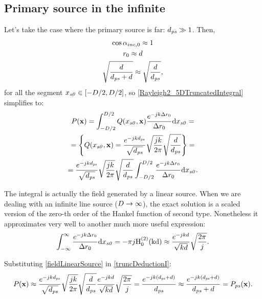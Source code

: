 \subsection{Primary source in the infinite}
Let's take the case where the primary source is far: $d_{\PosTheoSubInd[primarySource]} \gg 1$. Then,
\begin{gather*}
	\cos\normPrimaryPropAngleSection \approx 1 \\ \distLinePrimSource \approx d \\ \sqrt{\frac{d}{d_{\PosTheoSubInd[primarySource]} + d}} \approx \sqrt{\frac{d}{d_{\PosTheoSubInd[primarySource]}}},
\end{gather*}
for all the segment $\PosTheo[section][x] \in [-\sectionTheoLength/2, \sectionTheoLength/2]$, so \autoref{Rayleigh2_5DTruncatedIntegral} simplifies to:
\begin{multline}
	P(\PosTheo) = \int_{-\sectionTheoLength/2}^{\sectionTheoLength/2} Q(x_{\PosTheoSubInd[section]}, \PosTheo) \frac{e^{-jk\distLinePoint}}{\distLinePoint} \mathrm{d}\PosTheo[section][x] =\\
	= \left\{Q(x_{\PosTheoSubInd[section]}, \PosTheo) =  \frac{e^{-jkd_{\PosTheoSubInd[primarySource]}}}{\sqrt{d_{\PosTheoSubInd[primarySource]}}} \sqrt{\frac{j k}{2\pi}} \sqrt{\frac{d}{d_{\PosTheoSubInd[primarySource]}}}\right\} = \\
	= \frac{e^{-jkd_{\PosTheoSubInd[primarySource]}}}{\sqrt{d_{\PosTheoSubInd[primarySource]}}} \sqrt{\frac{j k}{2\pi}} \sqrt{\frac{d}{d_{\PosTheoSubInd[primarySource]}}} \int_{-\sectionTheoLength/2}^{\sectionTheoLength/2} \frac{e^{-jk\distLinePoint}}{\distLinePoint} \mathrm{d}\PosTheo[section][x].
	\label{truncDeductionI}
\end{multline}

The integral is actually the field generated by a linear source. When we are dealing with an infinite line source ($D \to \infty$), the exact solution is a scaled version of the zero-th order of the Hankel function of second type. Nonetheless it approximates very well to another much more useful expression:
\begin{equation}
\int_{-\infty}^{\infty} \frac{e^{-jk\distLinePoint}}{\distLinePoint} \mathrm{d}x_{\PosTheoSubInd[section]} = -\pi j \mathrm{H_0^{(2)}(k d)} \approx \frac{e^{-jkd}}{\sqrt{kd}}\sqrt{\frac{2\pi}{j}}.
\label{fieldLinearSource}
\end{equation}

Substituting \autoref{fieldLinearSource} in \autoref{truncDeductionI}:
\begin{equation}
P(\PosTheo) \approx \frac{e^{-jkd_{\PosTheoSubInd[primarySource]}}}{\sqrt{d_{\PosTheoSubInd[primarySource]}}} \sqrt{\frac{j k}{2\pi}} \sqrt{\frac{d}{d_{\PosTheoSubInd[primarySource]}}} \frac{e^{-jkd}}{\sqrt{kd}}\sqrt{\frac{2\pi}{j}} = \frac{e^{-jk(d_{\PosTheoSubInd[primarySource]} + d)}}{d_{\PosTheoSubInd[primarySource]}} \approx \frac{e^{-jk(d_{\PosTheoSubInd[primarySource]} + d)}}{d_{\PosTheoSubInd[primarySource]} + d} = P_{\PosTheoSubInd[primarySource]}(\PosTheo).
\end{equation}

